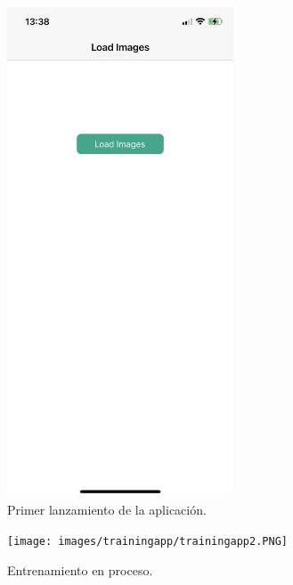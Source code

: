 \documentclass[../main.tex]{subfiles}
\begin{document}
\begin{figure}[h]
    \centering 
    \includegraphics[width=0.6\textwidth]{images/trainingapp/trainingapp1.PNG}
    \caption{Primer lanzamiento de la aplicación.}
    \label{figure6}
    \end{figure}
    
    \begin{figure}[h]
    \centering 
    \texttt{[image: images/trainingapp/trainingapp2.PNG]}
    \caption{Entrenamiento en proceso.}
    \label{figure7}
    \end{figure}
    
\end{document}
